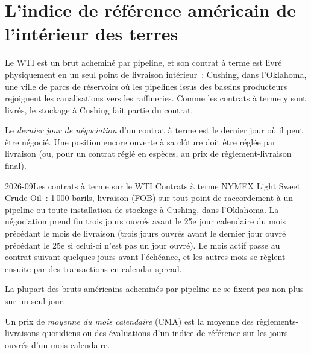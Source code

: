 \section{L'indice de référence américain de l'intérieur des terres}

Le WTI est un brut acheminé par pipeline, et son contrat à terme est livré physiquement en un
seul point de livraison intérieur~: Cushing, dans l'Oklahoma, une ville de parcs de réservoirs où les pipelines issus des
bassins producteurs rejoignent les canalisations vers les raffineries. Comme les contrats à terme y sont livrés,
le stockage à Cushing fait partie du contrat.

\begin{definition}\label{def:m3:crude-oil:ltd}
Le \emph{dernier jour de négociation} d'un contrat à terme est le
dernier jour où il peut être négocié. Une position encore ouverte à sa clôture doit être
réglée par livraison (ou, pour un contrat réglé en espèces, au prix de
règlement-livraison final).
\end{definition}

\begin{dated}{2026-09}{Les contrats à terme sur le WTI}\label{dat:m3:crude-oil:cl}
Contrats à terme NYMEX Light Sweet Crude Oil~: 1\,000 barils, livraison  (FOB) sur tout
point de raccordement à un pipeline ou toute installation de stockage à Cushing, dans l'Oklahoma. La négociation prend fin trois
jours ouvrés avant le 25e jour calendaire du mois précédant le mois de livraison (trois
jours ouvrés avant le dernier jour ouvré précédant le 25e si celui-ci n'est pas un jour
ouvré). Le mois actif passe au contrat suivant quelques jours avant l'échéance, et les
autres mois se règlent ensuite par des transactions en calendar spread.
\end{dated}

La plupart des bruts américains acheminés par pipeline ne se fixent pas non plus sur un seul jour.

\begin{definition}\label{def:m3:crude-oil:cma}
Un prix de \emph{moyenne du mois calendaire} (CMA) est la
moyenne des règlements-livraisons quotidiens ou des évaluations d'un indice de référence sur les
jours ouvrés d'un mois calendaire.
\end{definition}

